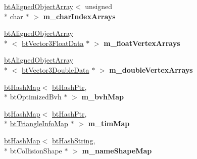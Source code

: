 \begin{DoxyCompactItemize}
\item 
\hypertarget{classbt_world_importer_a5cff034540d844778db3864d84018fce}{\hyperlink{classbt_aligned_object_array}{bt\+Aligned\+Object\+Array}$<$ unsigned \\*
char $\ast$ $>$ {\bfseries m\+\_\+char\+Index\+Arrays}}\label{classbt_world_importer_a5cff034540d844778db3864d84018fce}

\item 
\hypertarget{classbt_world_importer_ad008e7fd9c0314649dfd801ae0e9e5e8}{\hyperlink{classbt_aligned_object_array}{bt\+Aligned\+Object\+Array}\\*
$<$ \hyperlink{structbt_vector3_float_data}{bt\+Vector3\+Float\+Data} $\ast$ $>$ {\bfseries m\+\_\+float\+Vertex\+Arrays}}\label{classbt_world_importer_ad008e7fd9c0314649dfd801ae0e9e5e8}

\item 
\hypertarget{classbt_world_importer_aa99903261ca9d239f1e13e5c007cc59c}{\hyperlink{classbt_aligned_object_array}{bt\+Aligned\+Object\+Array}\\*
$<$ \hyperlink{structbt_vector3_double_data}{bt\+Vector3\+Double\+Data} $\ast$ $>$ {\bfseries m\+\_\+double\+Vertex\+Arrays}}\label{classbt_world_importer_aa99903261ca9d239f1e13e5c007cc59c}

\item 
\hypertarget{classbt_world_importer_a22d6ab53e60b24b3d9fbd1e6c81920de}{\hyperlink{classbt_hash_map}{bt\+Hash\+Map}$<$ \hyperlink{classbt_hash_ptr}{bt\+Hash\+Ptr}, \\*
bt\+Optimized\+Bvh $\ast$ $>$ {\bfseries m\+\_\+bvh\+Map}}\label{classbt_world_importer_a22d6ab53e60b24b3d9fbd1e6c81920de}

\item 
\hypertarget{classbt_world_importer_a6183f542e4bb50ee4c3a6f1b2b43619f}{\hyperlink{classbt_hash_map}{bt\+Hash\+Map}$<$ \hyperlink{classbt_hash_ptr}{bt\+Hash\+Ptr}, \\*
\hyperlink{structbt_triangle_info_map}{bt\+Triangle\+Info\+Map} $\ast$ $>$ {\bfseries m\+\_\+tim\+Map}}\label{classbt_world_importer_a6183f542e4bb50ee4c3a6f1b2b43619f}

\item 
\hypertarget{classbt_world_importer_a9adf75874e9a9601042b13ed526901da}{\hyperlink{classbt_hash_map}{bt\+Hash\+Map}$<$ \hyperlink{structbt_hash_string}{bt\+Hash\+String}, \\*
bt\+Collision\+Shape $\ast$ $>$ {\bfseries m\+\_\+name\+Shape\+Map}}\label{classbt_world_importer_a9adf75874e9a9601042b13ed526901da}


\end{DoxyCompactItemize}
